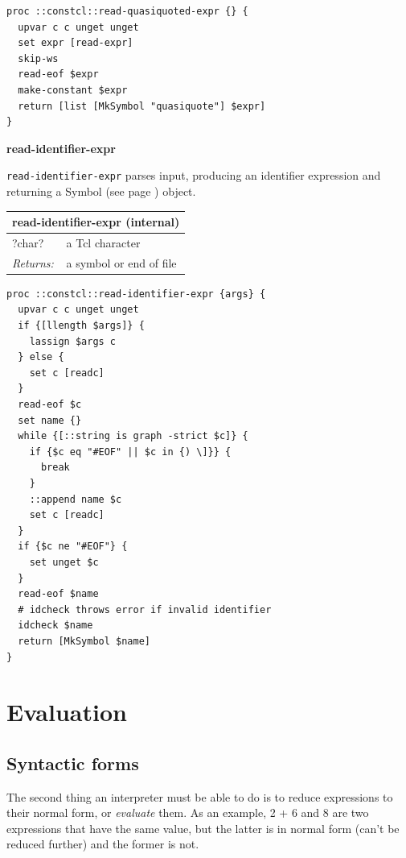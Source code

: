 \documentclass[twoside,9pt]{report}
\begin{document}
\noindent\makebox[\linewidth]{\rule{\linewidth}{0.4pt}}
\begin{lstlisting}
proc ::constcl::read-quasiquoted-expr {} {
  upvar c c unget unget
  set expr [read-expr]
  skip-ws
  read-eof $expr
  make-constant $expr
  return [list [MkSymbol "quasiquote"] $expr]
}
\end{lstlisting}
\noindent\makebox[\linewidth]{\rule{\linewidth}{0.4pt}}

\textbf{read-identifier-expr}


\texttt{read-identifier-expr} parses input, producing an identifier expression and returning a Symbol (see page \pageref{symbols}) object.

\begin{tabular}{ |l l| }
\hline
\multicolumn{2}{|l|}{read-identifier-expr (internal)} \\
\hline
?char? & a Tcl character \\
\textit{Returns:} & a symbol or end of file \\
\hline
\end{tabular}

\noindent\makebox[\linewidth]{\rule{\linewidth}{0.4pt}}
\begin{lstlisting}
proc ::constcl::read-identifier-expr {args} {
  upvar c c unget unget
  if {[llength $args]} {
    lassign $args c
  } else {
    set c [readc]
  }
  read-eof $c
  set name {}
  while {[::string is graph -strict $c]} {
    if {$c eq "#EOF" || $c in {) \]}} {
      break
    }
    ::append name $c
    set c [readc]
  }
  if {$c ne "#EOF"} {
    set unget $c
  }
  read-eof $name
  # idcheck throws error if invalid identifier
  idcheck $name
  return [MkSymbol $name]
}
\end{lstlisting}
\noindent\makebox[\linewidth]{\rule{\linewidth}{0.4pt}}
\chapter{Evaluation}
\label{evaluation}
\section{Syntactic forms}
\label{syntactic-forms}

The second thing an interpreter must be able to do is to reduce expressions to their normal form, or \emph{evaluate} them. As an example, 2 + 6 and 8 are two expressions that have the same value, but the latter is in normal form (can't be reduced further) and the former is not.
\end{document}
